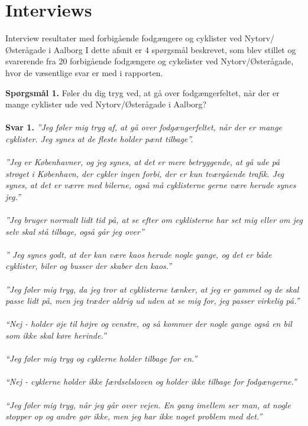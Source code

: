 \appendix
\label{appendix_start}
\chapter{Interviews}
  \label{chap:interviews}
Interview resultater med forbigående fodgængere og cyklister ved Nytorv/Østerågade i Aalborg I dette afsnit er 4 spørgsmål beskrevet, som blev stillet og svarerende fra 20 forbigående fodgængere og cykelister ved Nytorv/Østerågade, hvor de væsentlige svar er med i rapporten.

  \textbf{Spørgsmål 1.}
  Føler du dig tryg ved, at gå over fodgængerfeltet, når der er mange cyklister ude ved Nytorv/Østerågade i Aalborg?
\\\\
  \textbf{Svar 1.}
  \emph{”Jeg føler mig tryg af, at gå over fodgængerfeltet, når der er mange cyklister. Jeg synes at de fleste holder pænt tilbage”.}
\\\\
  \emph{”Jeg er Københavner, og jeg synes, at det er mere betryggende, at gå ude på strøget i København, der cykler ingen forbi, der er kun tværgående trafik. Jeg synes, at det er værre med bilerne, også må cyklisterne gerne være herude synes jeg.”}
\\\\
  \emph{”Jeg bruger normalt lidt tid på, at se efter om cyklisterne har set mig eller om jeg selv skal stå tilbage, også går jeg over”}
\\\\
  \emph{” Jeg synes godt, at der kan være kaos herude nogle gange, og det er både cyklister, biler og busser der skaber den kaos.”}
\\\\
  \emph{”Jeg føler mig tryg, da jeg tror at cyklisterne tænker, at jeg er gammel og de skal passe lidt på, men jeg træder aldrig ud uden at se mig for, jeg passer virkelig på.”}
\\\\
  \emph{“Nej - holder øje til højre og venstre, og så kommer der nogle gange også en bil som ikke skal køre herinde.”}
\\\\
  \emph{“Jeg føler mig tryg og cyklerne holder tilbage for en.”}
\\\\
  \emph{“Nej - cyklerne holder ikke færdselsloven og holder ikke tilbage for fodgængerne.”}
\\\\
  \emph{“Jeg føler mig tryg, når jeg går over vejen. En gang imellem ser man, at nogle stopper op og andre gør ikke, men jeg har ikke noget problem med det.”}
